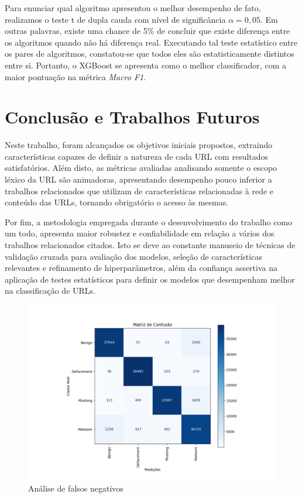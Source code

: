 \documentclass[manuscript,screen,review]{acmart}
\begin{document}
Para enunciar qual algoritmo apresentou o melhor desempenho de fato, realizamos o teste t de dupla cauda com nível de significância \(\alpha = 0,05\). Em outras palavras, existe uma chance de 5\% de concluir que existe diferença entre os algoritmos quando não há diferença real. Executando tal teste estatístico entre os pares de algoritmos, constatou-se que todos eles são estatisticamente distintos entre si. Portanto, o XGBoost se apresenta como o melhor classificador, com a maior pontuação na métrica \emph{Macro F1}.

\section{Conclusão e Trabalhos Futuros} \label{sec:5}

Neste trabalho, foram alcançados os objetivos iniciais propostos, extraindo características capazes de definir a natureza de cada URL com resultados satisfatórios. Além disto, as métricas avaliadas analisando somente o escopo léxico da URL são animadoras, apresentando desempenho pouco inferior a trabalhos relacionados que utilizam de características relacionadas à rede e conteúdo das URLs, tornando obrigatório o acesso às mesmas.

Por fim, a metodologia empregada durante o desenvolvimento do trabalho como um todo, apresenta maior robustez e confiabilidade em relação a vários dos trabalhos relacionados citados. Isto se deve ao constante manuseio de técnicas de validação cruzada para avaliação dos modelos, seleção de características relevantes e refinamento de hiperparâmetros, além da confiança assertiva na aplicação de testes estatísticos para definir os modelos que desempenham melhor na classificação de URLs.

\begin{figure}[H]
    \centering
    \includegraphics[width=1.1\textwidth]{pic/confusion.pdf}
    \caption{Análise de falsos negativos}
    \label{fig:exampleFig3}
\end{figure}
\end{document}
